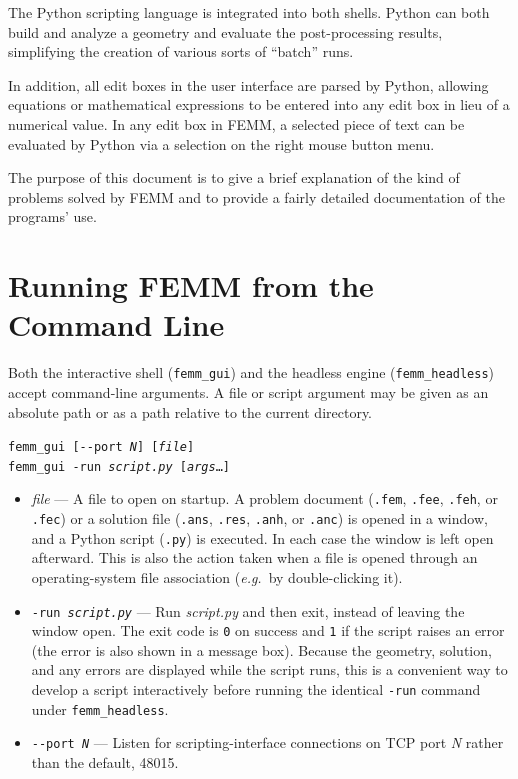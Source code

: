 \documentclass[12pt]{report}
\begin{document}
The Python scripting language is integrated into both shells. Python can both build and analyze a geometry and
evaluate the post-processing results, simplifying the creation of
various sorts of ``batch'' runs.

In addition, all edit boxes in the user interface are parsed by
Python, allowing equations or mathematical expressions to be entered
into any edit box in lieu of a numerical value.  In any edit box in
FEMM, a selected piece of text can be evaluated by Python via a
selection on the right mouse button menu.

The purpose of this document is to give a brief explanation of the
kind of problems solved by FEMM and to provide a fairly detailed
documentation of the programs' use.

\section{Running FEMM from the Command Line} \label{commandline}

Both the interactive shell ({\tt femm\_gui}) and the headless engine
({\tt femm\_headless}) accept command-line arguments.  A file or script
argument may be given as an absolute path or as a path relative to the current
directory.

\vspace{1ex}
 \texttt{femm\_gui [-{}-port {\itshape N}] [{\itshape file}]}\\
\texttt{femm\_gui -run {\itshape script.py} [{\itshape args}\ldots]}

\begin{itemize}
\item{\itshape file} --- A file to open on startup.  A problem document
({\tt .fem}, {\tt .fee}, {\tt .feh}, or {\tt .fec}) or a solution file
({\tt .ans}, {\tt .res}, {\tt .anh}, or {\tt .anc}) is opened in a window,
and a Python script ({\tt .py}) is executed.  In each case the window is left
open afterward.  This is also the action taken when a file is opened through an
operating-system file association (\emph{e.g.}\ by double-clicking it).

\item\texttt{-run {\itshape script.py}} --- Run {\itshape script.py} and then
exit, instead of leaving the window open.  The exit code is {\tt 0} on success
and {\tt 1} if the script raises an error (the error is also shown in a message
box).  Because the geometry, solution, and any errors are displayed while the
script runs, this is a convenient way to develop a script interactively before
running the identical {\tt -run} command under {\tt femm\_headless}.

\item\texttt{-{}-port {\itshape N}} --- Listen for scripting-interface
connections on TCP port {\itshape N} rather than the default, 48015.
\end{itemize}
\end{document}
